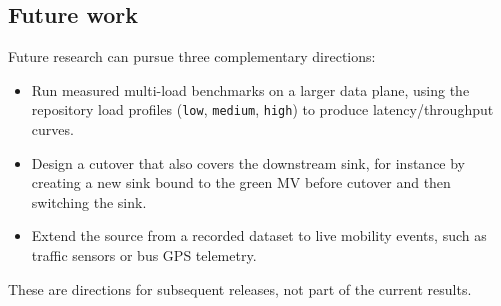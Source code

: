 \subsection{Future work}
Future research can pursue three complementary directions:

\begin{itemize}
\item Run measured multi-load benchmarks on a larger data plane, using the repository load profiles (\texttt{low}, \texttt{medium}, \texttt{high}) to produce latency/throughput curves.
\item Design a cutover that also covers the downstream sink, for instance by creating a new sink bound to the green MV before cutover and then switching the sink.
\item Extend the source from a recorded dataset to live mobility events, such as traffic sensors or bus GPS telemetry.
\end{itemize}

These are directions for subsequent releases, not part of the current results.
